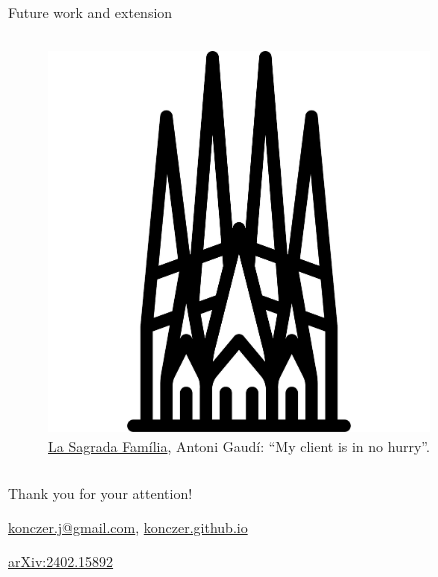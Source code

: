 \documentclass{beamer}
\theoremstyle{definition}
\begin{document}
\begin{frame}[shrink=15]{Future work and extension}
\begin{columns}
\begin{column}{0.3\textwidth}
    \begin{figure}
    \centering
        \includegraphics[width=0.9\textwidth]{img/logos/SagradaFamilia.pdf}
        \caption{\small \centering  \href{https://boutique.arte.tv/detail/sagrada-familia-le-defi-de-gaudi}{La Sagrada Família}, Antoni Gaudí: ``My client is in no hurry''.}
    \end{figure}
\end{column}
        

\end{columns}

\end{frame}


\begin{frame}{}

\centering \Huge
  {Thank you for your attention!}

    \vspace{0.85 cm}
    

    \vspace{0.85 cm}

    {\large
  \href{mailto:konczer.j@gmail.com}{konczer.j@gmail.com},
        \href{https://konczer.github.io/}{konczer.github.io}

        \href{https://arxiv.org/abs/2402.15892}{arXiv:2402.15892}
     }   
  
\end{frame}
\end{document}
